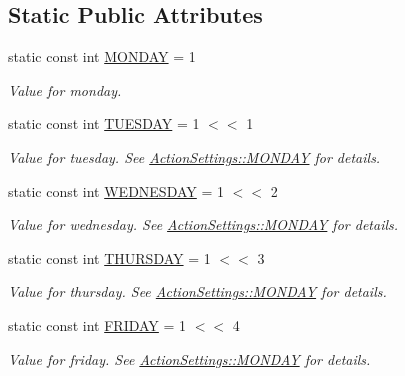 \subsection*{Static Public Attributes}
\begin{DoxyCompactItemize}
\item 
static const int \hyperlink{class_action_settings_a0a99a4562e37a11225063d1a10e0953a}{M\-O\-N\-D\-A\-Y} = 1
\begin{DoxyCompactList}\small\item\em Value for monday. \end{DoxyCompactList}\item 
static const int \hyperlink{class_action_settings_a387ace15273bbc582a7debc2fc158693}{T\-U\-E\-S\-D\-A\-Y} = 1 $<$$<$ 1
\begin{DoxyCompactList}\small\item\em Value for tuesday. See \hyperlink{class_action_settings_a0a99a4562e37a11225063d1a10e0953a}{Action\-Settings\-::\-M\-O\-N\-D\-A\-Y} for details. \end{DoxyCompactList}\item 
static const int \hyperlink{class_action_settings_a3b16f717b4ce866e31827451147485d2}{W\-E\-D\-N\-E\-S\-D\-A\-Y} = 1 $<$$<$ 2
\begin{DoxyCompactList}\small\item\em Value for wednesday. See \hyperlink{class_action_settings_a0a99a4562e37a11225063d1a10e0953a}{Action\-Settings\-::\-M\-O\-N\-D\-A\-Y} for details. \end{DoxyCompactList}\item 
static const int \hyperlink{class_action_settings_af4382214fc4cb662884ba314009ed4d6}{T\-H\-U\-R\-S\-D\-A\-Y} = 1 $<$$<$ 3
\begin{DoxyCompactList}\small\item\em Value for thursday. See \hyperlink{class_action_settings_a0a99a4562e37a11225063d1a10e0953a}{Action\-Settings\-::\-M\-O\-N\-D\-A\-Y} for details. \end{DoxyCompactList}\item 
static const int \hyperlink{class_action_settings_aa70504579778b73eb6627609d2360bf5}{F\-R\-I\-D\-A\-Y} = 1 $<$$<$ 4
\begin{DoxyCompactList}\small\item\em Value for friday. See \hyperlink{class_action_settings_a0a99a4562e37a11225063d1a10e0953a}{Action\-Settings\-::\-M\-O\-N\-D\-A\-Y} for details. \end{DoxyCompactList}\item 

\end{DoxyCompactItemize}
